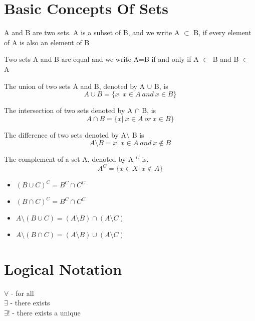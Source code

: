 \documentclass{report}
\begin{document}
\section{Basic Concepts Of Sets}
\begin{definition}[Subsets]
A and B are two sets. A is a subset of B, and we write A $\subset$ B, if every element of A is also an element of B
\end{definition}

\begin{theorem}
    Two sets A and B are equal and we write A=B if and only if A $\subset$ B and B $\subset$ A
\end{theorem}

\begin{definition}[Unions]
    The union of two sets A and B, denoted by A $\cup$ B, is
    \[ A \cup B = \{x|\ x \in A \ and \ x \in B\}\]
\end{definition}
\begin{definition}[Intersections]
    The intersection of two sets denoted by A $\cap$ B, is
    \[A \cap B = \{x|\ x \in A \ or \ x \in B\}\]
\end{definition}
\begin{definition}
    The difference of two sets denoted by A$\setminus$ B is
    \[A\setminus B = {x|\ x \in A \ and \ x \notin B}\]
\end{definition}

\begin{definition}
    The complement of a set A, denoted by A $^{C}$ is,
    \[A^{C} = \{x \in X |\ x \notin A \}\]
\end{definition}
\begin{itemize}
    \item $(B \cup C)^{C} = B^{C}  \cap C^{C}$
    \item $(B \cap C)^{C} = B^{C} \cap C^{C}$
    \item $A\setminus (B\cup C) = (A\setminus B) \cap (A \setminus C)$
    \item $A\setminus (B\cap C) = (A\setminus B) \cup (A \setminus C)$
\end{itemize}
\section{Logical Notation}
$\forall$ - for all\\
$\exists$ - there exists\\
$\exists!$ - there exists a unique\\
\end{document}
